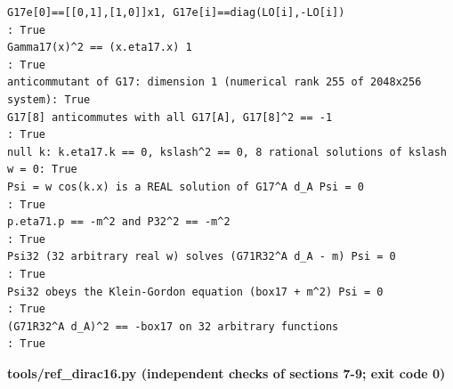 \documentclass[10pt,a4paper]{article}
\begin{document}
\begin{Verbatim}[fontsize=\small,frame=single,framesep=2mm]
G17e[0]==[[0,1],[1,0]]x1, G17e[i]==diag(LO[i],-LO[i])                 : True
Gamma17(x)^2 == (x.eta17.x) 1                                         : True
anticommutant of G17: dimension 1 (numerical rank 255 of 2048x256 system): True
G17[8] anticommutes with all G17[A], G17[8]^2 == -1                   : True
null k: k.eta17.k == 0, kslash^2 == 0, 8 rational solutions of kslash w = 0: True
Psi = w cos(k.x) is a REAL solution of G17^A d_A Psi = 0              : True
p.eta71.p == -m^2 and P32^2 == -m^2                                   : True
Psi32 (32 arbitrary real w) solves (G71R32^A d_A - m) Psi = 0         : True
Psi32 obeys the Klein-Gordon equation (box17 + m^2) Psi = 0           : True
(G71R32^A d_A)^2 == -box17 on 32 arbitrary functions                  : True
\end{Verbatim}
\textbf{tools/ref\_dirac16.py (independent checks of sections 7-9; exit code 0)}
\end{document}
